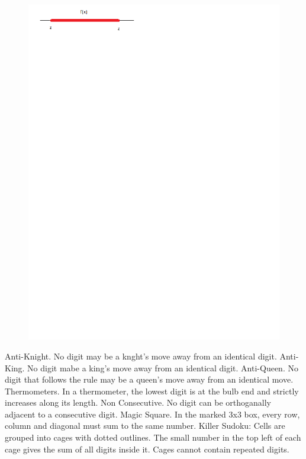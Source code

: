 \documentclass{article}
\begin{document}
\begin{figure}[!hb]
\centering
\includegraphics{numberline}
\end{figure}

Anti-Knight.  No digit may be a knght's move away from an identical digit.
Anti-King.  No digit mabe a king's move away from an identical digit.
Anti-Queen. No digit that follows the rule may be a queen's move away from an identical move. 
Thermometers. In a thermometer, the lowest digit is at the bulb end and strictly increases along its length. 
Non Consecutive. No digit can be orthoganally adjacent to a consecutive digit. 
Magic Square. In the marked 3x3 box, every row, column and diagonal must sum to the same number. 
Killer Sudoku: Cells are grouped into cages with dotted outlines.  The small number in the top left of each cage gives the sum of all digits inside it. Cages cannot contain repeated digits.
\end{document}
